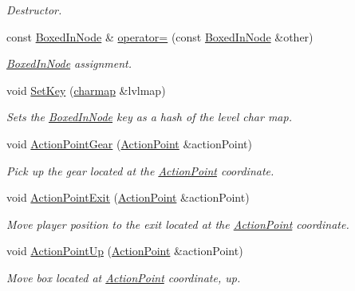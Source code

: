 \begin{DoxyCompactItemize}
\begin{DoxyCompactList}\small\item\em Destructor. \end{DoxyCompactList}\item 
const \hyperlink{classboxedin_1_1BoxedInNode}{Boxed\+In\+Node} \& \hyperlink{classboxedin_1_1BoxedInNode_a24cb7949e27b78ff14bad86e2f3d21ba}{operator=} (const \hyperlink{classboxedin_1_1BoxedInNode}{Boxed\+In\+Node} \&other)
\begin{DoxyCompactList}\small\item\em \hyperlink{classboxedin_1_1BoxedInNode}{Boxed\+In\+Node} assignment. \end{DoxyCompactList}\item 
void \hyperlink{classboxedin_1_1BoxedInNode_a70aa3595f1db9e8e3328c79765b0506c}{Set\+Key} (\hyperlink{namespaceboxedin_a95e88d677e0a17d3f9e4a9b0de980c4f}{charmap} \&lvlmap)
\begin{DoxyCompactList}\small\item\em Sets the \hyperlink{classboxedin_1_1BoxedInNode}{Boxed\+In\+Node} key as a hash of the level char map. \end{DoxyCompactList}\item 
void \hyperlink{classboxedin_1_1BoxedInNode_ab5653d55f2467a8ef040fc0ab25b9f84}{Action\+Point\+Gear} (\hyperlink{structboxedin_1_1ActionPoint}{Action\+Point} \&action\+Point)
\begin{DoxyCompactList}\small\item\em Pick up the gear located at the \hyperlink{structboxedin_1_1ActionPoint}{Action\+Point} coordinate. \end{DoxyCompactList}\item 
void \hyperlink{classboxedin_1_1BoxedInNode_a8e29dee7583137d58259b7b2e6400e45}{Action\+Point\+Exit} (\hyperlink{structboxedin_1_1ActionPoint}{Action\+Point} \&action\+Point)
\begin{DoxyCompactList}\small\item\em Move player position to the exit located at the \hyperlink{structboxedin_1_1ActionPoint}{Action\+Point} coordinate. \end{DoxyCompactList}\item 
void \hyperlink{classboxedin_1_1BoxedInNode_a24f7ba00ae0e7f63211d0a38b8a6f12a}{Action\+Point\+Up} (\hyperlink{structboxedin_1_1ActionPoint}{Action\+Point} \&action\+Point)
\begin{DoxyCompactList}\small\item\em Move box located at \hyperlink{structboxedin_1_1ActionPoint}{Action\+Point} coordinate, up. \end{DoxyCompactList}\item 

\end{DoxyCompactItemize}

